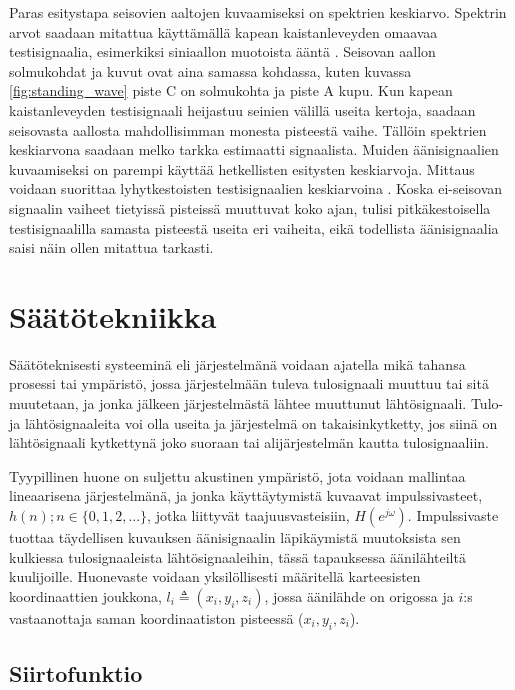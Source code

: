 \documentclass[finnish,12pt]{article}
\begin{document}
Paras esitystapa seisovien aaltojen kuvaamiseksi on spektrien keskiarvo. Spektrin arvot saadaan mitattua käyttämällä kapean kaistanleveyden omaavaa testisignaalia, esimerkiksi siniaallon muotoista ääntä \cite[s. 9]{Kahrs2002}. Seisovan aallon solmukohdat ja kuvut ovat aina samassa kohdassa, kuten kuvassa \ref{fig:standing_wave} piste C on solmukohta ja piste A kupu. Kun kapean kaistanleveyden testisignaali heijastuu seinien välillä useita kertoja, saadaan seisovasta aallosta mahdollisimman monesta pisteestä vaihe. Tällöin spektrien keskiarvona saadaan melko tarkka estimaatti signaalista. Muiden äänisignaalien kuvaamiseksi on parempi käyttää hetkellisten esitysten keskiarvoja. Mittaus voidaan suorittaa lyhytkestoisten testisignaalien keskiarvoina \cite[luku 1.4]{Kahrs2002}. Koska ei-seisovan signaalin vaiheet tietyissä pisteissä muuttuvat koko ajan, tulisi pitkäkestoisella testisignaalilla samasta pisteestä useita eri vaiheita, eikä todellista äänisignaalia saisi näin ollen mitattua tarkasti.

\clearpage

\section{Säätötekniikka}

Säätöteknisesti systeeminä eli järjestelmänä voidaan ajatella mikä tahansa prosessi tai ympäristö, jossa järjestelmään tuleva tulosignaali muuttuu tai sitä muutetaan, ja jonka jälkeen järjestelmästä lähtee muuttunut lähtösignaali. Tulo- ja lähtösignaaleita voi olla useita ja järjestelmä on takaisinkytketty, jos siinä on lähtösignaali kytkettynä joko suoraan tai alijärjestelmän kautta tulosignaaliin.

Tyypillinen huone on suljettu akustinen ympäristö, jota voidaan mallintaa lineaarisena järjestelmänä, ja jonka käyttäytymistä kuvaavat impulssivasteet, $h(n); n \in \{ 0, 1, 2, ... \}$, jotka liittyvät taajuusvasteisiin, $H(e^{j \omega})$. Impulssivaste tuottaa täydellisen kuvauksen äänisignaalin läpikäymistä muutoksista sen kulkiessa tulosignaaleista lähtösignaaleihin, tässä tapauksessa äänilähteiltä kuulijoille. Huonevaste voidaan yksilöllisesti määritellä karteesisten koordinaattien joukkona, $l_i \triangleq (x_i, y_i, z_i)$, jossa äänilähde on origossa ja $i$:s vastaanottaja saman koordinaatiston pisteessä ($x_i,y_i,z_i$). \cite{SBharitkar2001}

\subsection{Siirtofunktio}
\end{document}
